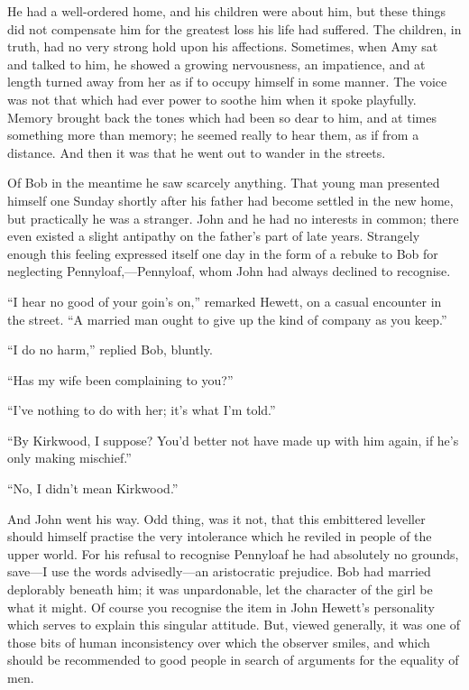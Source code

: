 He had a well-ordered home, and his children were about him, but these
things did not compensate him for the greatest loss his life {}had
suffered. The children, in truth, had no very strong hold upon his
affections. Sometimes, when Amy sat and talked to him, he showed a
growing nervousness, an impatience, and at length turned away from her
as if to occupy himself in some manner. The voice was not that which had
ever power to soothe him when it spoke playfully. Memory brought back
the tones which had been so dear to him, and at times something more
than memory; he seemed really to hear them, as if from a distance. And
then it was that he went out to wander in the streets.

Of Bob in the meantime he saw scarcely anything. That young man
presented himself one Sunday shortly after his father had become settled
in the new home, but practically he was a stranger. John and he had no
interests in common; there even existed a slight antipathy on the
father's part of late years. Strangely enough this feeling expressed
itself one day in the form of a rebuke to Bob for neglecting
Pennyloaf,---Pennyloaf, whom John had always declined to recognise.

{}``I hear no good of your goin's on,'' remarked Hewett, on a casual
encounter in the street. ``A married man ought to give up the kind of
company as you keep.''

``I do no harm,'' replied Bob, bluntly.

``Has my wife been complaining to you?''

``I've nothing to do with her; it's what I'm told.''

``By Kirkwood, I suppose? You'd better not have made up with him again,
if he's only making mischief.''

``No, I didn't mean Kirkwood.''

And John went his way. Odd thing, was it not, that this embittered
leveller should himself practise the very intolerance which he reviled
in people of the upper world. For his refusal to recognise Pennyloaf he
had absolutely no grounds, save---I use the words advisedly---an
aristocratic prejudice. Bob had married deplorably beneath him; it was
unpardonable, let the character of the girl be what it might. Of course
you recognise the item in John Hewett's personality which serves to
explain this singular attitude. But, viewed {}generally, it was one of
those bits of human inconsistency over which the observer smiles, and
which should be recommended to good people in search of arguments for
the equality of men.

